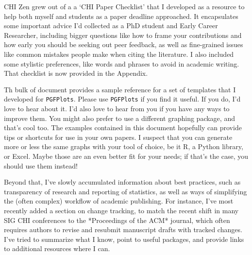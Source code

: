 \begin{markdown}
CHI Zen grew out of a a `CHI Paper Checklist' that I developed as a resource to help both myself and students as a paper deadline approached. It encapsulates some important advice I'd collected as a PhD student and Early Career Researcher, including bigger questions like how to frame your contributions and how early you should be seeking out peer feedback, as well as fine-grained issues like common mistakes people make when citing the literature. I also included some stylistic preferences, like words and phrases to avoid in academic writing. That checklist is now provided in the Appendix.

Th bulk of document provides a sample reference for a set of templates that I developed for \texttt{PGFPlots}. Please use \texttt{PGFPlots} if you find it useful. If you do, I'd love to hear about it. I'd also love to hear from you if you have any ways to improve them. You might also prefer to use a different graphing package, and that's cool too. The examples contained in this document hopefully can provide tips or shortcuts for use in your own papers. I suspect that you can generate more or less the same graphs with your tool of choice, be it R, a Python library, or Excel. Maybe those are an even better fit for your needs; if that's the case, you should use them instead! 

Beyond that, I've slowly accumulated information about best practices, such as transparency of research and reporting of statistics, as well as ways of simplifying the (often complex) workflow of academic publishing. For instance, I've most recently added a section on change tracking, to match the recent shift in many SIG CHI conferences to the *Proceedings of the ACM* journal, which often requires authors to revise and resubmit manuscript drafts with tracked changes. I've tried to summarize what I know, point to useful packages, and provide links to additional resources where I can. 

\end{markdown}






